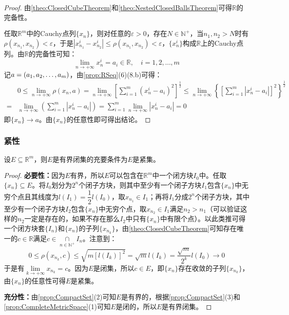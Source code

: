 \begin{proof}
	由\cref{theo:ClosedCubeTheorem}和\cref{theo:NestedClosedBallsTheorem}可得$\mathbb{R}$的完备性。\par
	任取$\mathbb{R}^{m}$中的Cauchy点列$\{x_n\}$，则对任意的$\varepsilon>0$，存在$N\in\mathbb{N}^+$，当$n_1,n_2>N$时有$\rho(x_{n_1},x_{n_2})<\varepsilon$，于是$|x_{n_1}^i-x_{n_2}^i|\leqslant\rho(x_{n_1},x_{n_2})<\varepsilon$，$\{x_{n}^i\}$构成$\mathbb{R}$上的Cauchy点列。由$\mathbb{R}$的完备性可知：
	\begin{equation*}
		\lim_{n\to+\infty}x_n^i=a_i\in\mathbb{R},\quad i=1,2,\dots,m
	\end{equation*}
	记$a=(a_1, a_2, \dots, a_{m})$，由\cref{prop:RSeq}(6)(8.b)可得：
	\begin{align*}
		&0\leqslant\lim_{n\to+\infty}\rho(x_n,a)=\lim_{n\to+\infty}\left[\sum_{i=1}^m(x_n^i-a_i)^2\right]^{\frac{1}{2}}\leqslant\lim_{n\to+\infty}\left\{\left[\sum_{i=1}^{m}|x_n^i-a_i|\right]^2\right\}^{\frac{1}{2}} \\
		=&\lim_{n\to+\infty}\left(\sum_{i=1}^{m}|x_n^i-a_i|\right)=\sum_{i=1}^{m}\lim_{n\to+\infty}|x_n^i-a_i|=0
	\end{align*}
	即$\{x_n\}\to  a$。由$\{x_n\}$的任意性即可得出结论。
\end{proof}
\subsubsection{紧性}
\begin{theorem}\label{theo:CompactRn}
	设$E\subseteq\mathbb{R}^{m}$，则$E$是有界闭集的充要条件为$E$是紧集。
\end{theorem}
\begin{proof}
	\textbf{必要性：}因为$E$有界，所以$E$可以包含在$\mathbb{R}^{m}$中一个闭方块$I_0$中。任取$\{x_n\}\subseteq E$。将$I_0$划分为$2^n$个闭子方块，则其中至少有一个闭子方块$I_1$包含$\{x_n\}$中无穷个点且其线度为$l(I_1)=\dfrac{1}{2}l(I_0)$，取$x_{n_1}\in I_1$；再将$I_1$分成$2^n$个闭子方块，其中至少有一个闭子方块$I_2$包含$\{x_n\}$中无穷个点，取$x_{n_2}\in I_1$满足$n_2>n_1$（可以验证这样的$n_2$一定是存在的，如果不存在那么$I_2$中只有$\{x_n\}$中有限个点）。以此类推可得一个闭方块套$\{I_n\}$和$\{x_n\}$的子列$\{x_{n_k}\}$，由\cref{theo:ClosedCubeTheorem}可知存在唯一的$c\in\mathbb{R}$满足$c\in\underset{n\in\mathbb{N}^+}{\cap}I_n$。注意到：
	\begin{equation*}
		0\leqslant\rho(x_{n_k},c)\leqslant\sqrt{m[l(I_k)]^2}=\sqrt{m}l(I_k)=\frac{\sqrt{m}}{2^k}l(I_0)\to0
	\end{equation*}
	于是有$\lim\limits_{k\to+\infty}x_{n_k}=c$。因为$E$是闭集，所以$c\in E$，即$\{x_n\}$存在收敛的子列$\{x_{n_k}\}$，由$\{x_n\}$的任意性可得$E$是紧集。\par
	\textbf{充分性：}由\cref{prop:CompactSet}(2)可知$E$是有界的，根据\cref{prop:CompactSet}(3)和\cref{prop:CompleteMetricSpace}(1)可知$E$是闭的，所以$E$是有界闭集。
\end{proof}
